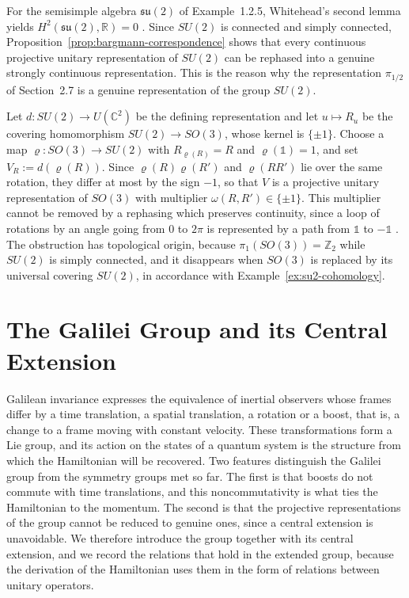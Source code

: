 \begin{example}\label{ex:su2-cohomology}
	For the semisimple algebra $\mathfrak{su}(2)$ of Example~1.2.5, Whitehead's second lemma yields $H^2(\mathfrak{su}(2),\mathbb{R})=0$ \cite[TODO-location]{TODO-Hum10}. Since $SU(2)$ is connected and simply connected, Proposition~\ref{prop:bargmann-correspondence} shows that every continuous projective unitary representation of $SU(2)$ can be rephased into a genuine strongly continuous representation. This is the reason why the representation $\pi_{1/2}$ of Section~2.7 is a genuine representation of the group $SU(2)$.
\end{example}

\begin{example}[$SO(3)$ and $SU(2)$]\label{ex:so3-su2}
	Let $d:SU(2)\to U(\mathbb{C}^2)$ be the defining representation and let $u\mapsto R_u$ be the covering homomorphism $SU(2)\to SO(3)$, whose kernel is $\{\pm1\}$. Choose a map $\varrho:SO(3)\to SU(2)$ with $R_{\varrho(R)}=R$ and $\varrho(\mathbb{1})=1$, and set $V_R:=d(\varrho(R))$. Since $\varrho(R)\varrho(R')$ and $\varrho(RR')$ lie over the same rotation, they differ at most by the sign $-1$, so that $V$ is a projective unitary representation of $SO(3)$ with multiplier $\omega(R,R')\in\{\pm1\}$. This multiplier cannot be removed by a rephasing which preserves continuity, since a loop of rotations by an angle going from $0$ to $2\pi$ is represented by a path from $\mathbb{1}$ to $-\mathbb{1}$ \cite[TODO-location]{TODO-Hal03}. The obstruction has topological origin, because $\pi_1(SO(3))=\mathbb{Z}_2$ while $SU(2)$ is simply connected, and it disappears when $SO(3)$ is replaced by its universal covering $SU(2)$, in accordance with Example~\ref{ex:su2-cohomology}.
\end{example}

\section{The Galilei Group and its Central Extension}
\label{sec:galilei}

Galilean invariance expresses the equivalence of inertial observers whose frames differ by a time translation, a spatial translation, a rotation or a boost, that is, a change to a frame moving with constant velocity. These transformations form a Lie group, and its action on the states of a quantum system is the structure from which the Hamiltonian will be recovered. Two features distinguish the Galilei group from the symmetry groups met so far. The first is that boosts do not commute with time translations, and this noncommutativity is what ties the Hamiltonian to the momentum. The second is that the projective representations of the group cannot be reduced to genuine ones, since a central extension is unavoidable. We therefore introduce the group together with its central extension, and we record the relations that hold in the extended group, because the derivation of the Hamiltonian uses them in the form of relations between unitary operators.

